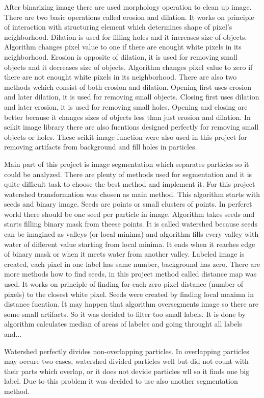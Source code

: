 After binarizing image there are used morphology operation to clean up image.
There are two basic operations called erosion and dilation. It works on principle
of interaction with structuring element which determines shape of pixel's neighborhood.
Dilation is used for filling holes and it increases size of objects. Algorithm changes pixel
value to one if there are enought white pixels in its neighborhood. Erosion is opposite
of dilation, it is used for removing small objects and it decreases size of objects.
Algorithm changes pixel value to zero if there are not enought white pixels in its
neighborhood. There are also two methods wchich consist of both erosion and dilation.
Opening first uses erosion and later dilation, it is used for removing small objects.
Closing first uses dilation and later erosion, it is used for removing small holes.
Opening and closing are better because it changes sizes of objects less than just erosion
and dilation. In scikit image library there are also fucntions designed perfectly
for removing small objects or holes. These scikit image function were also used
in this project for removing artifacts from background and fill holes in particles.

Main part of this project is image segmentation which separates particles so it could
be analyzed. There are plenty of methods used for segmentation and it is quite difficult
task to choose the best method and implement it. For this project watershed transformation
was chosen as main method. This algorithm starts with seeds and binary image. Seeds are
points or small clusters of points. In perferct world there should be one seed per
particle in image. Algorithm takes seeds and starts filling binary mask from theese points.
It is called watershed because seeds can be imagined as valleys (or local minima) and
algorithm fills every valley with water of different value starting from local minima.
It ends when it reaches edge of binary mask or when it meets water from another valley.
Labeled image is created, each pixel in one label has same number, background has zero.
There are more methods how to find seeds, in this project method called distance map
was used. It works on principle of finding for each zero pixel distance (number of pixels)
to the closest white pixel. Seeds were created by finding local maxima in distance fucntion.
It may happen that algorithm oversegments image so there are some small artifacts. So it
was decided to filter too small labels. It is done by algorithm calculates median of 
areas of labeles and going throught all labels and...

Watershed perfectly divides non-overlapping particles. In overlapping particles may occure
two cases, watershed divided particles well but did not count with their parts which
overlap, or it does not devide particles wll so it finds one big label. Due to this
problem it was decided to use also another segmentation method.